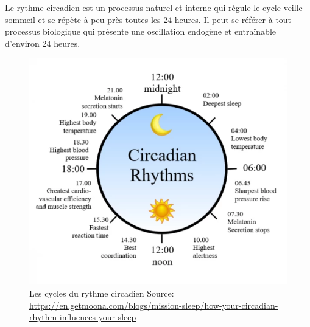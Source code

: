 




Le rythme circadien est un processus naturel et interne qui régule le cycle
veille-sommeil et se répète à peu près toutes les 24 heures.
Il peut se référer à tout processus biologique qui présente une oscillation
endogène et entraînable d'environ 24 heures.

\begin{figure}[h]
  \centering
  \includegraphics[scale=2.0]{media/circadien.png}
  \caption{
      Les cycles du rythme circadien\newline
      \tiny{Source: \url{https://en.getmoona.com/blogs/mission-sleep/how-your-circadian-rhythm-influences-your-sleep}}
  }
\end{figure}

